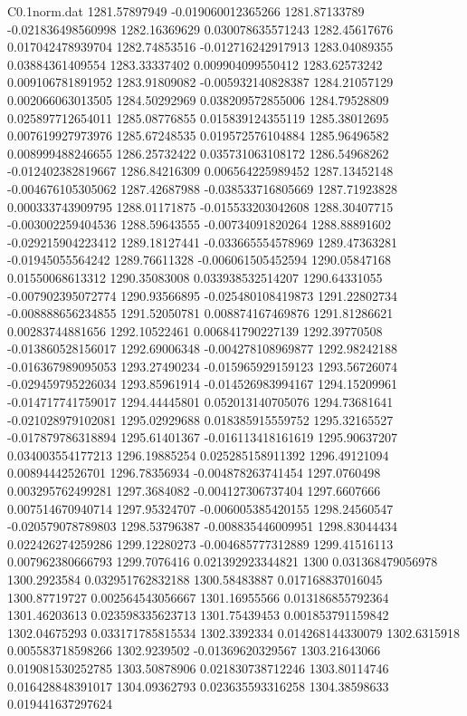 \begin{filecontents}{C0.1norm.dat}
1281.57897949		-0.019060012365266
1281.87133789		-0.021836498560998
1282.16369629		0.030078635571243
1282.45617676		0.017042478939704
1282.74853516		-0.012716242917913
1283.04089355		0.03884361409554
1283.33337402		0.009904099550412
1283.62573242		0.009106781891952
1283.91809082		-0.005932140828387
1284.21057129		0.002066063013505
1284.50292969		0.038209572855006
1284.79528809		0.025897712654011
1285.08776855		0.015839124355119
1285.38012695		0.007619927973976
1285.67248535		0.019572576104884
1285.96496582		0.008999488246655
1286.25732422		0.035731063108172
1286.54968262		-0.012402382819667
1286.84216309		0.006564225989452
1287.13452148		-0.004676105305062
1287.42687988		-0.038533716805669
1287.71923828		0.000333743909795
1288.01171875		-0.015533203042608
1288.30407715		-0.003002259404536
1288.59643555		-0.00734091820264
1288.88891602		-0.029215904223412
1289.18127441		-0.033665554578969
1289.47363281		-0.01945055564242
1289.76611328		-0.006061505452594
1290.05847168		0.01550068613312
1290.35083008		0.033938532514207
1290.64331055		-0.007902395072774
1290.93566895		-0.025480108419873
1291.22802734		-0.008888656234855
1291.52050781		0.008874167469876
1291.81286621		0.00283744881656
1292.10522461		0.006841790227139
1292.39770508		-0.013860528156017
1292.69006348		-0.004278108969877
1292.98242188		-0.016367989095053
1293.27490234		-0.015965929159123
1293.56726074		-0.029459795226034
1293.85961914		-0.014526983994167
1294.15209961		-0.014717741759017
1294.44445801		0.052013140705076
1294.73681641		-0.021028979102081
1295.02929688		0.018385915559752
1295.32165527		-0.017879786318894
1295.61401367		-0.016113418161619
1295.90637207		0.034003554177213
1296.19885254		0.025285158911392
1296.49121094		0.00894442526701
1296.78356934		-0.004878263741454
1297.0760498		0.003295762499281
1297.3684082		-0.004127306737404
1297.6607666		0.007514670940714
1297.95324707		-0.006005385420155
1298.24560547		-0.020579078789803
1298.53796387		-0.008835446009951
1298.83044434		0.022426274259286
1299.12280273		-0.004685777312889
1299.41516113		0.007962380666793
1299.7076416		0.021392923344821
1300		0.031368479056978
1300.2923584		0.032951762832188
1300.58483887		0.017168837016045
1300.87719727		0.002564543056667
1301.16955566		0.013186855792364
1301.46203613		0.023598335623713
1301.75439453		0.001853791159842
1302.04675293		0.033171785815534
1302.3392334		0.014268144330079
1302.6315918		0.005583718598266
1302.9239502		-0.01369620329567
1303.21643066		0.019081530252785
1303.50878906		0.021830738712246
1303.80114746		0.016428848391017
1304.09362793		0.023635593316258
1304.38598633		0.019441637297624

\end{filecontents}
